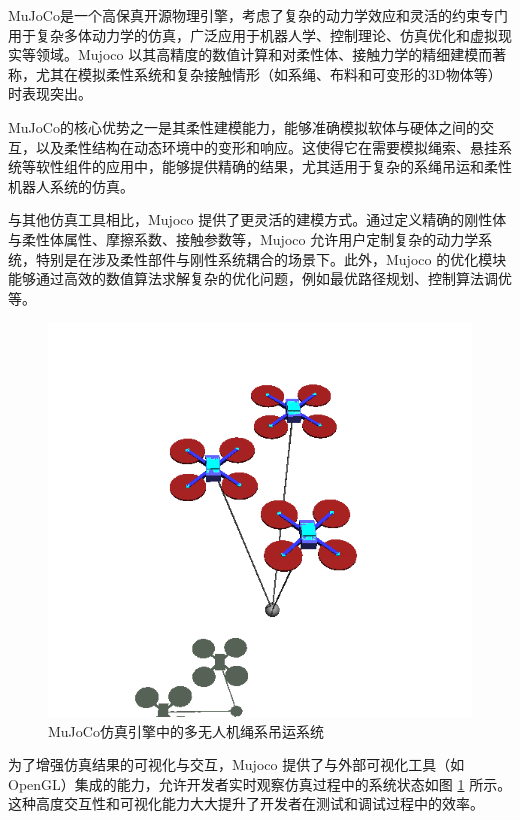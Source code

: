 \documentclass[lang=chs, degree=master, blindreview=false, winfonts=true]{yanputhesis}
\begin{document}
MuJoCo是一个高保真开源物理引擎，考虑了复杂的动力学效应和灵活的约束专门用于复杂多体动力学的仿真，广泛应用于机器人学、控制理论、仿真优化和虚拟现实等领域。Mujoco 以其高精度的数值计算和对柔性体、接触力学的精细建模而著称，尤其在模拟柔性系统和复杂接触情形（如系绳、布料和可变形的3D物体等）时表现突出。

MuJoCo的核心优势之一是其柔性建模能力，能够准确模拟软体与硬体之间的交互，以及柔性结构在动态环境中的变形和响应。这使得它在需要模拟绳索、悬挂系统等软性组件的应用中，能够提供精确的结果，尤其适用于复杂的系绳吊运和柔性机器人系统的仿真。

与其他仿真工具相比，Mujoco 提供了更灵活的建模方式。通过定义精确的刚性体与柔性体属性、摩擦系数、接触参数等，Mujoco 允许用户定制复杂的动力学系统，特别是在涉及柔性部件与刚性系统耦合的场景下。此外，Mujoco 的优化模块能够通过高效的数值算法求解复杂的优化问题，例如最优路径规划、控制算法调优等。

\begin{figure}[hbt!]
	\centering
	\includegraphics[width=34pc]{picture/5_3.png} 
	\caption{MuJoCo仿真引擎中的多无人机绳系吊运系统} 
	\label{5_3}
\end{figure}

为了增强仿真结果的可视化与交互，Mujoco 提供了与外部可视化工具（如 OpenGL）集成的能力，允许开发者实时观察仿真过程中的系统状态如图 \ref{5_3} 所示。这种高度交互性和可视化能力大大提升了开发者在测试和调试过程中的效率。
\end{document}
